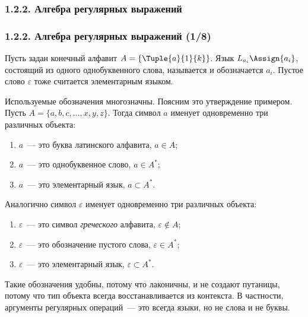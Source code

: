 \subsubsection{1.2.2. Алгебра регулярных выражений}\label{1.2.2.}
\begin{frame}
\frametitle{1.2.2. Алгебра регулярных выражений (1/8)}

Пусть задан конечный алфавит $A=\{\Tuple{a}{1}{k}\}$. Язык $L_{a_i}\Assign\{a_i\}$,
состоящий из одного однобуквенного слова, называется
 и обозначается $a_i$.
Пустое слово $\varepsilon$ тоже считается элементарным языком.  

\begin{digress}
Используемые обозначения многозначны.
Поясним это утверждение примером.\\
Пусть $A=\{a,b,c,\dots,x,y,z\}$. 
Тогда символ $a$ именует одновременно три различных объекта:
\begin{enumerate}
\item $a$~--- это буква латинского алфавита, $a\in A$;\\[-2pt]
\item $a$~--- это однобуквенное слово, $a\in A^*$;\\[-2pt]
\item $a$~--- это элементарный язык, $a\subset A^*$.\\[-2pt]
\end{enumerate}
Аналогично символ $\varepsilon$ именует одновременно три различных объекта:
\begin{enumerate}
\item $\varepsilon$~--- это символ {\em греческого}
алфавита, $\varepsilon\not\in A$;\\[-2pt]
\item $\varepsilon$~--- это обозначение пустого слова, $\varepsilon\in A^*$;\\[-2pt]
\item $\varepsilon$~--- это элементарный язык, $\varepsilon\subset A^*$.\\[-2pt]
\end{enumerate}
Такие обозначения удобны, 
потому что лаконичны, и не создают 
путаницы, потому что 
тип объекта всегда восстанавливается из контекста. В частности,
аргументы регулярных операций~--- это 
всегда языки, но не слова и не буквы.
\end{digress} 
\end{frame}

